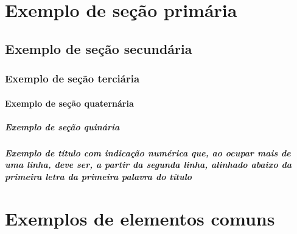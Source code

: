 \documentclass[
    12pt, %
    oneside,
    a4paper,
    english,
    brazil
]{report}
\begin{document}
\onehalfspacing
\justify

\setlength\parindent{1.25cm} %
\setlength{\parskip}{1.241pt} %


\tableofcontents

\begingroup
  \chapter{Exemplo de seção primária}
  \lipsum[1-1]

  \section{Exemplo de seção secundária}
  \lipsum[2-4]

  \subsection{Exemplo de seção terciária}
  \lipsum[5-5]

  \subsubsection{Exemplo de seção quaternária}
  \lipsum[6-6]

  \paragraph{Exemplo de seção quinária} %
  \lipsum[7-7]

  \paragraph{Exemplo de título com indicação numérica que, ao ocupar mais de uma linha, deve ser, a partir da segunda linha, alinhado abaixo da primeira letra da primeira palavra do título}
  \lipsum[8-8]
\endgroup

\begingroup
  \chapter{Exemplos de elementos comuns}
\end{document}

